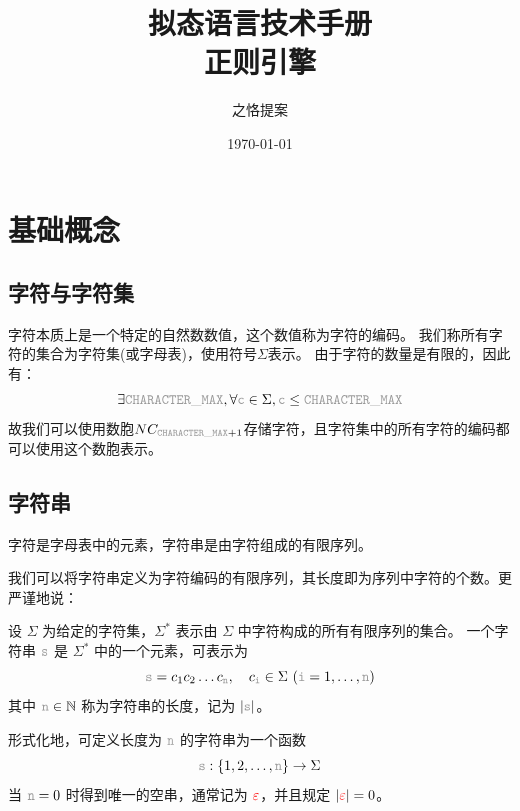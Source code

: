 \documentclass[12pt,a4paper,UTF8]{ctexart}
\title{拟态语言技术手册\\{\small 正则引擎}}
\author{之恪提案}
\date{\today}
\newcommand{\var}[1]{\textcolor{lightgray}{\mathtt{#1}}}
\newcommand{\func}[1]{\textcolor{red}{#1}}
\begin{document}
\maketitle
\thispagestyle{empty} %

\setcounter{page}{0} %

\maketitle
\clearpage

\tableofcontents
\newpage

\setcounter{page}{1} %

\section{基础概念}

\subsection{字符与字符集}

\qquad 字符本质上是一个特定的自然数数值，这个数值称为字符的编码。
我们称所有字符的集合为字符集(或字母表)，使用符号$\Sigma$表示。
由于字符的数量是有限的，因此有：
\[\exists \var{CHARACTER\_MAX}, \forall \var{c} \in \Sigma, \var{c} \le \var{CHARACTER\_MAX}\]
故我们可以使用数胞$NC_{\var{CHARACTER\_MAX}+1}$存储字符，且字符集中的所有字符的编码都可以使用这个数胞表示。

\subsection{字符串}

\qquad 字符是字母表中的元素，字符串是由字符组成的有限序列。

\qquad 我们可以将字符串定义为字符编码的有限序列，其长度即为序列中字符的个数。更严谨地说：

\qquad 设 $\Sigma$ 为给定的字符集，$\Sigma^*$ 表示由 $\Sigma$ 中字符构成的所有有限序列的集合。  
一个字符串 $\var{s}$ 是 $\Sigma^*$ 中的一个元素，可表示为  
\[\var{s} = c_1 c_2 \dots c_{\var{n}}, \quad c_{\var{i}} \in \Sigma\ (\var{i}=1,\dots,\var{n})\]
其中 $\var{n} \in \mathbb{N}$ 称为字符串的长度，记为 $|\var{s}|$。  

形式化地，可定义长度为 $\var{n}$ 的字符串为一个函数  
\[\var{s} : \{1,2,\dots,\var{n}\} \to \Sigma\]  
当 $\var{n}=0$ 时得到唯一的空串，通常记为 $\func{\varepsilon}$，并且规定 $|\func{\varepsilon}| = 0$。
\end{document}
